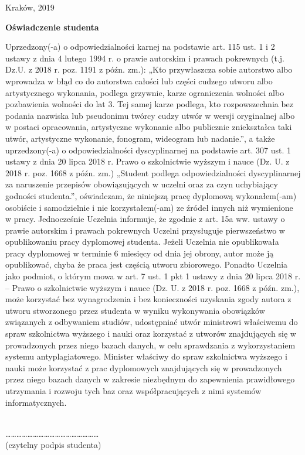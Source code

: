 \documentclass[12pt,a4paper,titlepage]{article}
\begin{document}
\begin{center}
Kraków, 2019
\end{center}
\newpage

\begin{center}
\textbf{Oświadczenie studenta}
\end{center}

Uprzedzony(-a) o odpowiedzialności karnej na podstawie art. 115 ust. 1 i 2 ustawy z dnia
4 lutego 1994 r. o prawie autorskim i prawach pokrewnych (t.j. Dz.U. z 2018 r. poz.
1191 z późn. zm.): „Kto przywłaszcza sobie autorstwo albo wprowadza w błąd co do
autorstwa całości lub części cudzego utworu albo artystycznego wykonania, podlega
grzywnie, karze ograniczenia wolności albo pozbawienia wolności do lat 3. Tej samej
karze podlega, kto rozpowszechnia bez podania nazwiska lub pseudonimu twórcy cudzy
utwór w wersji oryginalnej albo w postaci opracowania, artystyczne wykonanie albo
publicznie zniekształca taki utwór, artystyczne wykonanie, fonogram, wideogram lub
nadanie.”, a także uprzedzony(-a) o odpowiedzialności dyscyplinarnej na podstawie art.
307 ust. 1 ustawy z dnia 20 lipca 2018 r. Prawo o szkolnictwie wyższym i nauce (Dz. U.
z 2018 r. poz. 1668 z późn. zm.) „Student podlega odpowiedzialności dyscyplinarnej za
naruszenie przepisów obowiązujących w uczelni oraz za czyn uchybiający godności
studenta.”, oświadczam, że niniejszą pracę dyplomową wykonałem(-am) osobiście
i samodzielnie i nie korzystałem(-am) ze źródeł innych niż wymienione w pracy.
Jednocześnie Uczelnia informuje, że zgodnie z art. 15a ww. ustawy o prawie autorskim
i prawach pokrewnych Uczelni przysługuje pierwszeństwo w opublikowaniu pracy
dyplomowej studenta. Jeżeli Uczelnia nie opublikowała pracy dyplomowej w terminie
6 miesięcy od dnia jej obrony, autor może ją opublikować, chyba że praca jest częścią
utworu zbiorowego. Ponadto Uczelnia jako podmiot, o którym mowa w art. 7 ust. 1 pkt 1
ustawy z dnia 20 lipca 2018 r. – Prawo o szkolnictwie wyższym i nauce (Dz. U. z 2018 r.
poz. 1668 z późn. zm.), może korzystać bez wynagrodzenia i bez konieczności uzyskania
zgody autora z utworu stworzonego przez studenta w wyniku wykonywania obowiązków
związanych z odbywaniem studiów, udostępniać utwór ministrowi właściwemu do spraw
szkolnictwa wyższego i nauki oraz korzystać z utworów znajdujących się w prowadzonych
przez niego bazach danych, w celu sprawdzania z wykorzystaniem systemu
antyplagiatowego. Minister właściwy do spraw szkolnictwa wyższego i nauki może
korzystać z prac dyplomowych znajdujących się w prowadzonych przez niego bazach
danych w zakresie niezbędnym do zapewnienia prawidłowego utrzymania i rozwoju tych
baz oraz współpracujących z nimi systemów informatycznych.
\\
\\
\begin{flushright}
……………………………………………\\
(czytelny podpis studenta)
\end{flushright}
\newpage
\end{document}
